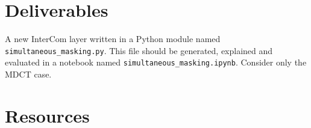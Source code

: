 
\section{Deliverables}

A new InterCom layer written in a Python module named
\verb|simultaneous_masking.py|. This file should be generated,
explained and evaluated in a notebook named
\verb|simultaneous_masking.ipynb|. Consider only the MDCT case.

\section{Resources}



